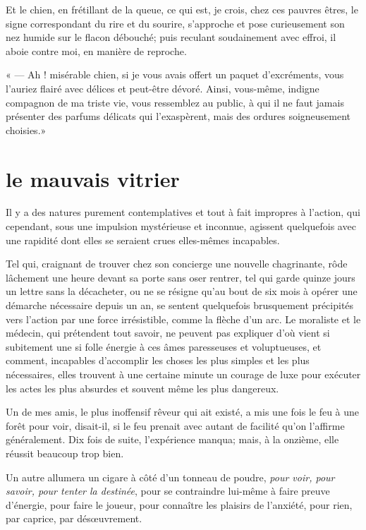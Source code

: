 Et le chien, en frétillant de la queue, ce qui est, je crois, chez ces
pauvres êtres, le signe correspondant du rire et du sourire,
s’approche et pose curieusement son nez humide sur le
flacon débouché; puis reculant soudainement avec effroi, il aboie
contre moi, en manière de reproche.

« --- Ah ! misérable chien, si je vous avais offert un paquet
d’excréments, vous l’auriez flairé
avec délices et peut{}-être dévoré. Ainsi, vous{}-même, indigne
compagnon de ma triste vie, vous ressemblez au public, à qui il ne faut
jamais présenter des parfums délicats qui
l’exaspèrent, mais des ordures soigneusement choisies.»


\quebra\section[Le mauvais vitrier]{le mauvais vitrier}

Il y a des natures purement contemplatives et tout à fait impropres à
l’action, qui cependant, sous une impulsion
mystérieuse et inconnue, agissent quelquefois avec une rapidité dont
elles se seraient crues elles{}-mêmes incapables.

Tel qui, craignant de trouver chez son concierge une nouvelle
chagrinante, rôde lâchement une heure devant sa porte sans oser
rentrer, tel qui garde quinze jours un lettre sans la décacheter, ou ne
se résigne qu’au bout de six mois à opérer une
démarche nécessaire depuis un an, se sentent quelquefois brusquement
précipités vers l’action par une force irrésistible,
comme la flèche d’un arc. Le moraliste et le médecin,
qui prétendent tout savoir, ne peuvent pas expliquer
d’où vient si subitement une si folle énergie à ces
âmes paresseuses et voluptueuses, et comment, incapables
d’accomplir les choses les plus simples et les plus
nécessaires, elles trouvent à une certaine minute un courage de luxe
pour exécuter les actes les plus absurdes et souvent même les plus
dangereux.

Un de mes amis, le plus inoffensif rêveur qui ait existé, a mis une fois
le feu à une forêt pour voir, disait{}-il, si le feu prenait avec
autant de facilité qu’on l’affirme
généralement. Dix fois de suite, l’expérience manqua;
mais, à la onzième, elle réussit beaucoup trop bien.

Un autre allumera un cigare à côté d’un tonneau de
poudre, \textit{pour voir, pour savoir, pour tenter la destinée}, pour se
contraindre lui{}-même à faire preuve d’énergie, pour
faire le joueur, pour connaître les plaisirs de
l’anxiété, pour rien, par caprice, par dés\oe uvrement.

